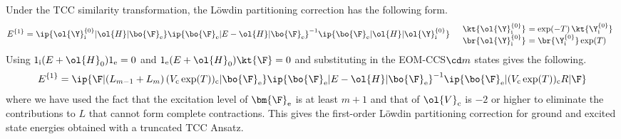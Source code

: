 \begin{rmk}
Under the TCC similarity transformation, the L\"owdin partitioning correction has the following form.
\begin{align}
  E^{\{1\}}
=
  \ip{\ol{\Y}_{\text{i}}^{\{0\}}|\ol{H}|\bo{\F}_{\text{e}}}
  \ip{\bo{\F}_{\text{e}}|E - \ol{H}|\bo{\F}_{\text{e}}}^{-1}
  \ip{\bo{\F}_{\text{e}}|\ol{H}|\ol{\Y}_{\text{i}}^{\{0\}}}
&&
\begin{array}{r@{\ }l}
  \kt{\ol{\Y}_{\text{i}}^{\{0\}}}
&=
  \text{exp}(-T)\,\kt{\Y_{\text{i}}^{\{0\}}}
\\
  \br{\ol{\Y}_{\text{i}}^{\{0\}}}
&=
  \br{\Y_{\text{i}}^{\{0\}}}\,
  \text{exp}(T)
\end{array}
\end{align}
Using
$
  1_{\text{i}}(E + \ol{H}_0) 1_{\text{e}}
=
  0
$
and
$
  1_{\text{e}}(E + \ol{H}_0)\kt{\F}
=
  0
$
and substituting in the EOM-CCS${\cd}m$ states gives the following.
\begin{align}
  E^{\{1\}}
=
  \ip{\F|(L_{m-1} + L_m)\,(V_{\text{c}}\,\text{exp}(T))_{\text{c}}|\bo{\F}_{\text{e}}}
  \ip{\bo{\F}_{\text{e}}|E - \ol{H}|\bo{\F}_{\text{e}}}^{-1}
  \ip{\bo{\F}_{\text{e}}|(V_{\text{c}}\,\text{exp}(T))_{\text{c}} R|\F}
\end{align}
where we have used the fact that the excitation level of $\bm{\F}_{\text{e}}$ is at least $m+1$ and that of $\ol{V}_{\text{c}}$ is $-2$ or higher to eliminate the contributions to $L$ that cannot form complete contractions.
This gives the first-order L\"owdin partitioning correction for ground and excited state energies obtained with a truncated TCC Ansatz.
\end{rmk}





